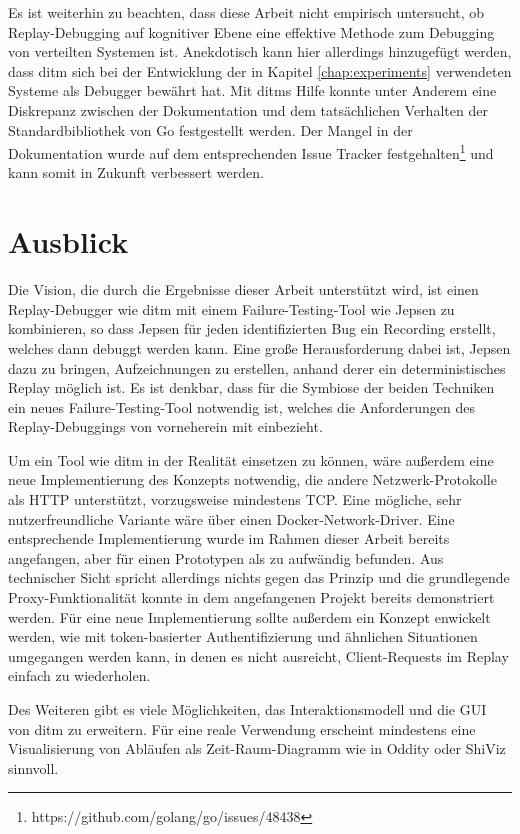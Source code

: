 \documentclass[12pt,a4paper]{report}
\begin{document}
Es ist weiterhin zu beachten, dass diese Arbeit nicht empirisch untersucht, ob Replay-Debugging auf kognitiver Ebene eine
effektive Methode zum Debugging von verteilten Systemen ist.  Anekdotisch kann hier allerdings hinzugefügt werden, dass ditm sich
bei der Entwicklung der in Kapitel \ref{chap:experiments} verwendeten Systeme als Debugger bewährt hat. Mit ditms Hilfe konnte
unter Anderem eine Diskrepanz zwischen der Dokumentation und dem tatsächlichen Verhalten der Standardbibliothek von Go
festgestellt werden. Der Mangel in der Dokumentation wurde auf dem entsprechenden Issue Tracker
festgehalten\footnote{https://github.com/golang/go/issues/48438} und kann somit in Zukunft verbessert werden.

\section{Ausblick}
Die Vision, die durch die Ergebnisse dieser Arbeit unterstützt wird, ist einen Replay-Debugger wie ditm mit einem Failure-Testing-Tool
wie Jepsen zu kombinieren, so dass Jepsen für jeden identifizierten Bug ein Recording erstellt, welches dann debuggt werden kann.
Eine große Herausforderung dabei ist, Jepsen dazu zu bringen, Aufzeichnungen zu erstellen, anhand derer ein deterministisches
Replay möglich ist. Es ist denkbar, dass für die Symbiose der beiden Techniken ein neues Failure-Testing-Tool notwendig ist,
welches die Anforderungen des Replay-Debuggings von vorneherein mit einbezieht.

Um ein Tool wie ditm in der Realität einsetzen zu können, wäre außerdem eine neue Implementierung des Konzepts notwendig, die
andere Netzwerk-Protokolle als HTTP unterstützt, vorzugsweise mindestens TCP. Eine mög\-liche, sehr nutzerfreundliche Variante wäre
über einen Docker-Network-Driver. Eine entsprechende Implementierung wurde im Rahmen dieser Arbeit bereits angefangen, aber für
einen Prototypen als zu aufwändig befunden. Aus technischer Sicht spricht allerdings nichts gegen das Prinzip und die grundlegende
Proxy-Funktionalität konnte in dem angefangenen Projekt bereits demonstriert werden. Für eine neue Implementierung sollte außerdem
ein Konzept enwickelt werden, wie mit token-basierter Authentifizierung und ähnlichen Situationen umgegangen werden kann, in denen
es nicht ausreicht, Client-Requests im Replay einfach zu wiederholen.

Des Weiteren gibt es viele Möglichkeiten, das Interaktionsmodell und die GUI von ditm zu erweitern. Für eine reale Verwendung
erscheint mindestens eine Visualisierung von Abläufen als Zeit-Raum-Diagramm wie in Oddity \cite{oddity_graphical_debugger} oder
ShiViz \cite{ShiViz_visual_debugger} sinnvoll.
\end{document}

